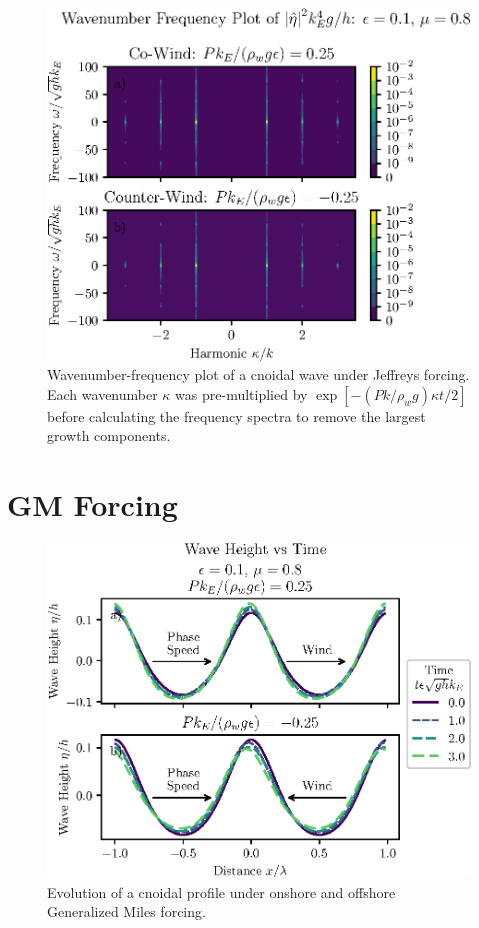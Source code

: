 \documentclass{jfm}
\let\Oldsection\section
\renewcommand{\section}{\FloatBarrier\Oldsection}
\begin{document}
\begin{figure}
  \centering
  \includegraphics{Double-Power-Spectrum-Jeffreys.eps}
  \caption{
    Wavenumber-frequency plot of a cnoidal wave under Jeffreys forcing.
    Each wavenumber $\kappa$ was pre-multiplied by $\exp[-(P k/\rho_w
    g) \kappa t/2]$ before calculating the frequency spectra to remove
    the largest growth components.
  }
\end{figure}

\section{GM Forcing}
\begin{figure}
  \centering
  \includegraphics{Snapshots-Positive-Negative-Cnoidal-GM.eps}
  \caption{
    Evolution of a cnoidal profile under onshore and offshore Generalized
    Miles forcing.
  }
\end{figure}
\end{document}
